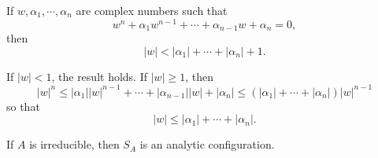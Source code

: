 \documentclass[a4paper,11pt]{article}
\begin{document}
\begin{lem}
  \label{lem:4}
  If $w, \alpha_1, \cdots, \alpha_n$ are complex numbers such that
  $$
  w^n + \alpha_1 w^{n-1} + \cdots + \alpha_{n-1} w + \alpha_n = 0,
  $$
  then
  $$
  |w| < |\alpha_1| + \cdots + |\alpha_n| + 1.
  $$
\end{lem}

\begin{myproof}
  If $|w| < 1$, the result holds.  If $|w| \ge 1$, then
  $$
  |w|^n \le |\alpha_1||w|^{n-1} + \cdots + |\alpha_{n-1}| |w|
  + |\alpha_n| \le (|\alpha_1| + \cdots + |\alpha_n|)|w|^{n-1}
  $$
  so that
  $$
  |w| \le |\alpha_1| + \cdots + |\alpha_n|.
  $$
\end{myproof}

\begin{thm}
  \label{thm:1}
  If $A$ is irreducible, then $S_A$ is an analytic configuration.
\end{thm}
\end{document}
